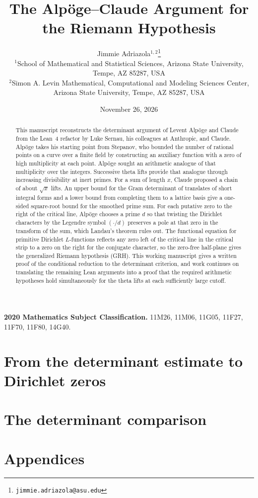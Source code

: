 \documentclass[11pt,letterpaper]{article}
\title{\bfseries The Alp\"oge--Claude Argument for the Riemann Hypothesis}
\author{Jimmie Adriazola$^{1,2}$\thanks{\texttt{jimmie.adriazola@asu.edu}}\\[6pt]
\small $^1$School of Mathematical and Statistical Sciences, Arizona State University,\\[-2pt]
\small Tempe, AZ 85287, USA\\[3pt]
\small $^2$Simon A. Levin Mathematical, Computational and Modeling Sciences Center,\\[-2pt]
\small Arizona State University, Tempe, AZ 85287, USA}
\date{November 26, 2026}
\theoremstyle{definition}
\numberwithin{equation}{section}
\begin{document}
\maketitle
\begin{abstract}
This manuscript reconstructs the determinant argument of Levent Alp\"oge and Claude
from the Lean~4 refactor by Luke Sernau, his colleagues at Anthropic, and Claude.
Alp\"oge takes his starting point from Stepanov, who bounded the number of rational points on a curve over a finite
field by constructing an auxiliary function with a zero of high multiplicity at each point.
Alp\"oge sought an arithmetic analogue of that multiplicity over the integers.
Successive theta lifts provide that analogue through increasing divisibility at inert primes.
For a sum of length \(x\), Claude proposed a chain of about \(\sqrt{x}\) lifts.
An upper bound for the Gram determinant of translates of short integral forms
and a lower bound from completing them to a lattice basis give a one-sided
square-root bound for the smoothed prime sum.
For each putative zero to the right of the critical line, Alp\"oge chooses a
prime \(d\) so that twisting the Dirichlet characters by the Legendre symbol
\((\cdot/d)\) preserves a pole at that zero in the transform of the sum,
which Landau's theorem rules out. The functional equation for primitive Dirichlet \(L\)-functions reflects any zero left of the critical line in the critical strip to a zero on the right for the conjugate character, so the zero-free half-plane gives the generalized Riemann hypothesis (GRH). This working manuscript gives a written proof of the conditional reduction to the determinant criterion, and work continues on translating the remaining Lean arguments into a proof that the required arithmetic hypotheses hold simultaneously for the theta lifts at each sufficiently large cutoff.
\end{abstract}

\noindent\textbf{2020 Mathematics Subject Classification.} 11M26, 11M06, 11G05, 11F27, 11F70, 11F80, 14G40.


\clearpage
\tableofcontents
\clearpage
\part{From the determinant estimate to Dirichlet zeros}\label{part:analytic}

\clearpage
\part{The determinant comparison}\label{part:determinant}





\clearpage
\appendix
\part*{Appendices}







\end{document}
